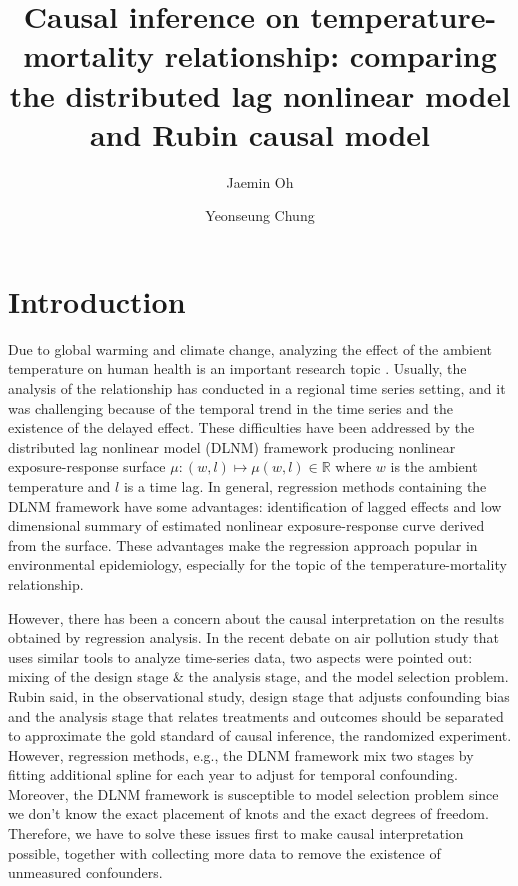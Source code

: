 \documentclass[12pt]{article}
\author[1]{Jaemin Oh}
\author[2]{Yeonseung Chung}
\affil[1,2]{Department of Mathematical Sciences, 
KAIST, Daejeon, South Korea}
\title{
	Causal inference on temperature-mortality relationship: 
	comparing the distributed lag nonlinear model and Rubin causal model
	} %
\begin{document}
\maketitle



\section{Introduction}

Due to global warming and climate change,
analyzing the effect of the ambient temperature on human health is an important research topic
\cite{gasparrini2015, yoonhee2019, temperaturemorbidity}.
Usually, the analysis of the relationship has conducted in a regional time series setting,
and it was challenging because of the temporal trend in the time series and the existence of the delayed effect.
These difficulties have been addressed by 
the distributed lag nonlinear model (DLNM) framework\cite{dlnm2010}
producing nonlinear exposure-response surface
$\mu : (w, l) \mapsto \mu(w,l) \in \mathbb{R}$ where $w$ is the ambient temperature and $l$ is a time lag.
In general, regression methods containing the DLNM framework have some advantages:
identification of lagged effects and
low dimensional summary of estimated nonlinear exposure-response curve derived from the surface.
These advantages make the regression approach popular in environmental epidemiology,
especially for the topic of the temperature-mortality relationship.

However, there has been a concern about the causal interpretation 
on the results obtained by regression analysis.
In the recent debate on air pollution study\cite{dominici2019sci} 
that uses similar tools to analyze time-series data,
two aspects were pointed out:
mixing of the design stage \& the analysis stage, and the model selection problem.
Rubin said, in the observational study,
design stage that adjusts confounding bias and the analysis stage that relates treatments and outcomes
should be separated to approximate the gold standard of causal inference, 
the randomized experiment\cite{rubin2007sim}.
However, regression methods, e.g., the DLNM framework mix two stages
by fitting additional spline for each year to adjust for temporal confounding.
Moreover, the DLNM framework is susceptible to model selection problem\cite{gasparrini2016}
since we don't know the exact placement of knots and the exact degrees of freedom.
Therefore, we have to solve these issues first to make causal interpretation possible,
together with collecting more data to remove the existence of unmeasured confounders.
\end{document}
